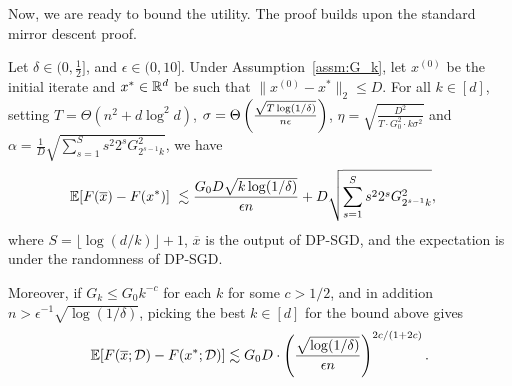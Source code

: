 Now, we are ready to bound the utility. 
The proof builds upon the standard mirror descent proof.
\begin{lemm}
\label{lm:utility_DPSGD_appendix}
Let $\delta \in (0, \frac{1}{2}]$, and $\epsilon \in (0, 10]$.
Under Assumption~\ref{assm:G_k}, let $x^{(0)}$ be the initial iterate and $x^{*} \in \mathbb{R}^d$ be such that $\|x^{(0)}-x^{*}\|_2\le D$.
For all $k \in [d]$,
setting $T=\Theta(n^2 + d \log^2 d)$,
 $\sigma=\Theta \left( \frac{\sqrt{T\log(1/\delta)}}{n\epsilon} \right)$, $\eta=\sqrt{\frac{D^{2}}{T\cdot G_{0}^{2}\cdot k\sigma^{2}}}$
and $\alpha=\frac{1}{D}\sqrt{\sum_{s=1}^S s^2 2^{s}G_{2^{s-1}k}^{2}}$, we have
\begin{align*}
\mathbb{E} [F(\overline{x})- F(x^{*})] &~ \lesssim \frac{G_{0}D\sqrt{k\log(1/\delta)}}{\epsilon n}+D\sqrt{\sum_{s=1}^{S} s^2 2^{s}G_{2^{s-1}k}^{2}},
\end{align*}
where $S = \lfloor \log(d/k) \rfloor + 1$, $\overline{x}$ is the output of DP-SGD, and the expectation is under the randomness of DP-SGD.

Moreover, if $G_k\leq G_0 k^{-c}$ for each $k$ for some $c>1/2$, and in addition $n > \epsilon^{-1} \sqrt{\log(1/\delta)} $, picking the best $k \in [d]$ for the bound above gives
\begin{align*}
    \mathbb{E}[F(\overline{x};\mathcal D)-F(x^*;\mathcal D)]\lesssim
        G_{0}D\cdot \left(
            \frac{\sqrt{\log(1/\delta)}}{\epsilon n}
        \right)^{2c/(1+2c)}.
\end{align*}
\end{lemm}

